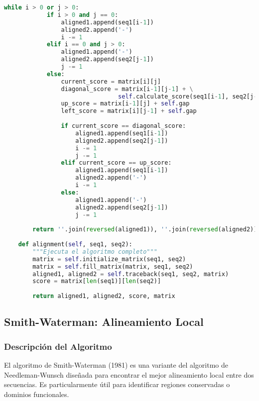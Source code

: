 \documentclass[12pt,a4paper]{article}
\begin{document}
\begin{lstlisting}[language=Python, caption=Clase NeedlemanWunsch en Python]
        while i > 0 or j > 0:
            if i > 0 and j == 0:
                aligned1.append(seq1[i-1])
                aligned2.append('-')
                i -= 1
            elif i == 0 and j > 0:
                aligned1.append('-')
                aligned2.append(seq2[j-1])
                j -= 1
            else:
                current_score = matrix[i][j]
                diagonal_score = matrix[i-1][j-1] + \
                                self.calculate_score(seq1[i-1], seq2[j-1])
                up_score = matrix[i-1][j] + self.gap
                left_score = matrix[i][j-1] + self.gap
                
                if current_score == diagonal_score:
                    aligned1.append(seq1[i-1])
                    aligned2.append(seq2[j-1])
                    i -= 1
                    j -= 1
                elif current_score == up_score:
                    aligned1.append(seq1[i-1])
                    aligned2.append('-')
                    i -= 1
                else:
                    aligned1.append('-')
                    aligned2.append(seq2[j-1])
                    j -= 1
        
        return ''.join(reversed(aligned1)), ''.join(reversed(aligned2))
    
    def alignment(self, seq1, seq2):
        """Ejecuta el algoritmo completo"""
        matrix = self.initialize_matrix(seq1, seq2)
        matrix = self.fill_matrix(matrix, seq1, seq2)
        aligned1, aligned2 = self.traceback(seq1, seq2, matrix)
        score = matrix[len(seq1)][len(seq2)]
        
        return aligned1, aligned2, score, matrix
\end{lstlisting}

\subsection{Smith-Waterman: Alineamiento Local}

\subsubsection{Descripción del Algoritmo}

El algoritmo de Smith-Waterman (1981) es una variante del algoritmo de Needleman-Wunsch diseñada para encontrar el mejor alineamiento local entre dos secuencias. Es particularmente útil para identificar regiones conservadas o dominios funcionales.
\end{document}
